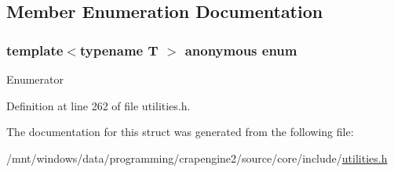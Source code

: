 \subsection{Member Enumeration Documentation}
\hypertarget{structcrap_1_1align__of_ae6e1e0ba0f4e74c10d92aa8849e230e5}{\subsubsection[{anonymous enum}]{\setlength{\rightskip}{0pt plus 5cm}template$<$typename T $>$ anonymous enum}}\label{structcrap_1_1align__of_ae6e1e0ba0f4e74c10d92aa8849e230e5}
\begin{Desc}
\item[Enumerator]\par
\begin{description}
\item[{\em 
\hypertarget{structcrap_1_1align__of_ae6e1e0ba0f4e74c10d92aa8849e230e5a8b5c1072cbffe59ec024940bd1bcbe2b}{size}\label{structcrap_1_1align__of_ae6e1e0ba0f4e74c10d92aa8849e230e5a8b5c1072cbffe59ec024940bd1bcbe2b}
}]\item[{\em 
\hypertarget{structcrap_1_1align__of_ae6e1e0ba0f4e74c10d92aa8849e230e5a681bb33919188c1863cff58c23b72e69}{value}\label{structcrap_1_1align__of_ae6e1e0ba0f4e74c10d92aa8849e230e5a681bb33919188c1863cff58c23b72e69}
}]\end{description}
\end{Desc}


Definition at line 262 of file utilities.\+h.



The documentation for this struct was generated from the following file\+:\begin{DoxyCompactItemize}
\item 
/mnt/windows/data/programming/crapengine2/source/core/include/\hyperlink{utilities_8h}{utilities.\+h}\end{DoxyCompactItemize}
